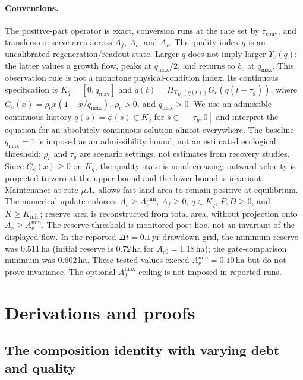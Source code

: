 \documentclass[11pt,a4paper]{article}
\newcommand{\Ups}{\Upsilon_c}
\newcommand{\Acmin}{A_c^{\min}}
\newcommand{\tconv}{\tau_{\mathrm{conv}}}
\begin{document}
\paragraph{Conventions.} The positive-part operator is exact, conversion runs at the rate set by $\tconv$, and transfers conserve area across $A_f$, $A_c$, and $A_r$. The quality index $q$ is an uncalibrated regeneration/readout state. Larger $q$ does not imply larger $\Ups(q)$: the latter values a growth flow, peaks at $q_{\max}/2$, and returns to $b_c$ at $q_{\max}$. This observation rule is not a monotone physical-condition index. Its continuous specification is $K_q=[0,q_{\max}]$ and $\dot q(t)=\Pi_{T_{K_q}(q(t))}G_c(q(t-\tau_g))$, where $G_c(x)=\rho_cx(1-x/q_{\max})$, $\rho_c>0$, and $q_{\max}>0$. We use an admissible continuous history $q(s)=\phi(s)\in K_q$ for $s\in[-\tau_g,0]$ and interpret the equation for an absolutely continuous solution almost everywhere. The baseline $q_{\max}=1$ is imposed as an admissibility bound, not an estimated ecological threshold; $\rho_c$ and $\tau_g$ are scenario settings, not estimates from recovery studies. Since $G_c(x)\ge0$ on $K_q$, the quality state is nondecreasing; outward velocity is projected to zero at the upper bound and the lower bound is invariant. Maintenance at rate $\mu A_r$ allows fast-land area to remain positive at equilibrium. The numerical update enforces $A_c\ge\Acmin$, $A_f\ge0$, $q\in K_q$, $P,D\ge0$, and $K\ge K_{\min}$; reserve area is reconstructed from total area, without projection onto $A_r\ge A_r^{\min}$. The reserve threshold is monitored post hoc, not an invariant of the displayed flow. In the reported $\Delta t=0.1$\,yr drawdown grid, the minimum reserve was $0.511$\,ha (initial reserve is $0.72$\,ha for $A_{c0}=1.18$\,ha); the gate-comparison minimum was $0.602$\,ha. These tested values exceed $A_r^{\min}=0.10$\,ha but do not prove invariance. The optional $A_f^{\max}$ ceiling is not imposed in reported runs.

\section{Derivations and proofs}\label{si:proofs}

\subsection{The composition identity with varying debt and quality}\label{si:identity}
\end{document}
